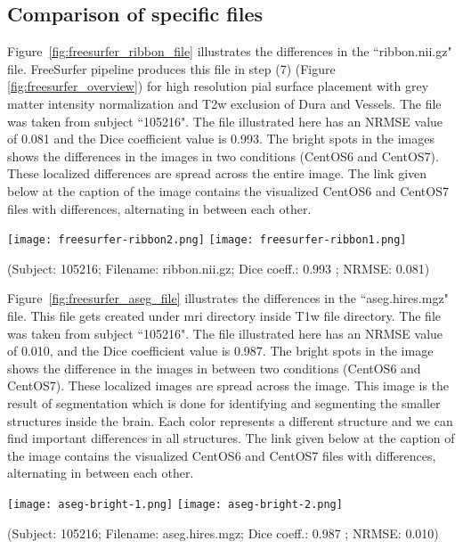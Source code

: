 \subsection{Comparison of specific files}
Figure~\ref{fig:freesurfer_ribbon_file} illustrates the differences in the ``ribbon.nii.gz" file. FreeSurfer pipeline produces this file in step (7) (Figure \ref{fig:freesurfer_overview}) for high resolution pial surface placement with grey matter intensity normalization and T2w exclusion of Dura and Vessels.
The file was taken from subject ``105216". The file illustrated here has an NRMSE value of 0.081 and the Dice coefficient value is 0.993. The bright spots in the images shows the differences in the images in two conditions (CentOS6 and CentOS7). These localized differences are spread across the entire image.
The link given below at the caption of the image contains the visualized CentOS6 and CentOS7 files with differences, alternating in between each other.

\begin{center}
\texttt{[image: freesurfer-ribbon2.png]}%
\texttt{[image: freesurfer-ribbon1.png]}
\caption*{(Subject: 105216; Filename: ribbon.nii.gz; Dice coeff.: 0.993 ; NRMSE: 0.081)}
\label{fig:freesurfer_ribbon_file}
\end{center}

Figure~\ref{fig:freesurfer_aseg_file} illustrates the differences in the ``aseg.hires.mgz" file. This file gets created under mri directory inside T1w file directory. The file was taken from subject ``105216". The file illustrated here has an NRMSE value of 0.010, and the Dice coefficient value is 0.987. The bright spots in the image shows the difference in the images in between two conditions (CentOS6 and CentOS7). These localized images are spread across the image. This image is the result of segmentation which is done for identifying and segmenting the smaller structures inside the brain. Each color represents a different structure and we can find important differences in all structures. The link given below at the caption of the image contains the visualized CentOS6 and CentOS7 files with differences, alternating in between each other.

\begin{center}
\texttt{[image: aseg-bright-1.png]}%
\texttt{[image: aseg-bright-2.png]}
\caption*{(Subject: 105216; Filename: aseg.hires.mgz; Dice coeff.: 0.987 ; NRMSE: 0.010)}
\label{fig:freesurfer_aseg_file}
\end{center}

